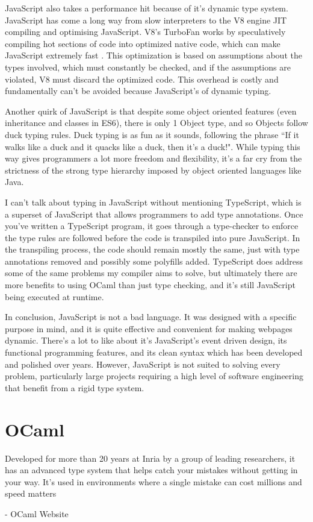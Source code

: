 \documentclass[12pt,a4paper,twoside,openright]{report}
\begin{document}
JavaScript also takes a performance hit because of it's dynamic type system.
JavaScript has come a long way from slow interpreters to the V8 engine JIT compiling and optimising JavaScript.
V8's TurboFan works by speculatively compiling hot sections of code into optimized native code, which can make JavaScript extremely fast \cite{v8-jit}.
This optimization is based on assumptions about the types involved, which must constantly be checked, and if the assumptions are violated, V8 must discard the optimized code.
This overhead is costly and fundamentally can't be avoided because JavaScript's of dynamic typing.

Another quirk of JavaScript is that despite some object oriented features (even inheritance and classes in ES6), there is only 1 Object type, and so Objects follow duck typing rules.
Duck typing is as fun as it sounds, following the phrase ``If it walks like a duck and it quacks like a duck, then it's a duck!".
While typing this way gives programmers a lot more freedom and flexibility, it's a far cry from the strictness of the strong type hierarchy imposed by object oriented languages like Java.

I can't talk about typing in JavaScript without mentioning TypeScript, which is a superset of JavaScript that allows programmers to add type annotations.
Once you've written a TypeScript program, it goes through a type-checker to enforce the type rules are followed before the code is transpiled into pure JavaScript.
In the transpiling process, the code should remain mostly the same, just with type annotations removed and possibly some polyfills added.
TypeScript does address some of the same problems my compiler aims to solve, but ultimately there are more benefits to using OCaml than just type checking, and it's still JavaScript being executed at runtime.

In conclusion, JavaScript is not a bad language.
It was designed with a specific purpose in mind, and it is quite effective and convenient for making webpages dynamic.
There's a lot to like about it's JavaScript's event driven design, its functional programming features, and its clean syntax which has been developed and polished over years.
However, JavaScript is not suited to solving every problem, particularly large projects requiring a high level of software engineering that benefit from a rigid type system.

\section{OCaml}
\epigraph{Developed for more than 20 years at Inria by a group of leading researchers, it has an advanced type system that helps catch your mistakes without getting in your way. It's used in environments where a single mistake can cost millions and speed matters \cite{ocamlorg}}{- OCaml Website}
\end{document}
